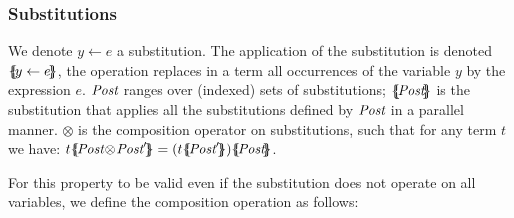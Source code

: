 \documentclass{lmcs}
\newcommand{\TODO}[1]{\textcolor{red}{\textbf{[TODO:#1]}}}
\newcommand{\ERIC}[1]{\textcolor{blue}{#1}}
\newcommand{\shortotimes}{\!\otimes\!}
\begin{document}


\subsubsection*{Substitutions}
\label{def:substitutions}

We denote $y\gets e$ a substitution. The application of the substitution is denoted
$\{\hspace{-0.88ex}\{\!y\gets e\!\}\hspace{-0.87ex}\}$, the operation replaces in a term all occurrences 
of the variable $y$ by the expression $e$. 
$\Post$ ranges over (indexed) sets of substitutions; $\subst{\Post}$ is the substitution that applies all the substitutions defined by $\Post$ in a parallel manner. $\otimes$ is the composition operator on substitutions, such that for any term $t$ we have: $t\subst{\Post\shortotimes\Post'} = (t\subst{\Post'})\subst{\Post}$.

For this property to be valid even if the substitution does not operate on all variables,
we define the composition operation as follows: 
%
\end{document}
